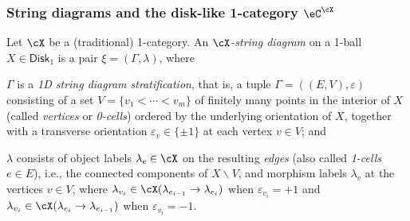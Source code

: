 \documentclass[12pt,reqno]{amsart}
\newcommand{\Disk}{\mathsf{Disk}}
\newcommand{\e}{\varepsilon}
\newcommand{\defn}[1]{\emph{#1}}
\renewcommand{\setminus}{\smallsetminus}
\begin{document}
\subsubsection{String diagrams and the disk-like 1-category \texorpdfstring{$\eC^\cX$}{C(X)}}
Let $\cX$ be a (traditional) 1-category. An \defn{$\cX$-string diagram} on a 1-ball $X \in \Disk_1$ is a pair $\xi=(\Gamma,\lambda)$, where
\begin{lst} 
\item $\Gamma$ is a \defn{1D string diagram stratification}, that is, a tuple $\Gamma=((E,V),\e)$ consisting of a set $V=\{v_1<\cdots<v_m\}$ of finitely many points in the interior of $X$ (called \defn{vertices} or \defn{0-cells}) ordered by the underlying orientation of $X$, together with a transverse orientation $\varepsilon_v \in \{\pm 1\}$ at each vertex $v\in V$; and
\item $\lambda$ consists of object labels $\lambda_{e}\in\cX$ on the resulting \defn{edges} (also called \defn{1-cells} $e\in E$), i.e., the connected components of $X\setminus V$, and morphism labels $\lambda_{v}$ at the vertices $v\in V$, where $\lambda_{v_i} \in\cX(\lambda_{e_{i-1}} \to \lambda_{e_i})$ when $\varepsilon_{v_i} = +1$ and $\lambda_{v_i} \in\cX(\lambda_{e_i} \to \lambda_{e_{i-1}})$ when $\varepsilon_{v_i} = -1$.
\end{lst}
\end{document}
